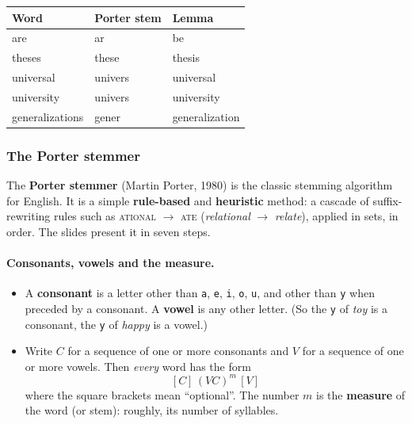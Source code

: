 \begin{center}
\small
\begin{tabular}{@{}l l l@{}}
\toprule
\textbf{Word} & \textbf{Porter stem} & \textbf{Lemma} \\
\midrule
are          & ar       & be \\
theses       & these    & thesis \\
universal    & univers  & universal \\
university   & univers  & university \\
generalizations & gener & generalization \\
\bottomrule
\end{tabular}
\end{center}

\subsubsection{The Porter stemmer}

The \textbf{Porter stemmer} (Martin Porter, 1980) is the classic stemming algorithm for
English. It is a simple \textbf{rule-based} and \textbf{heuristic} method: a cascade of
suffix-rewriting rules such as \textsc{ational} $\to$ \textsc{ate}
(\emph{relational} $\to$ \emph{relate}), applied in sets, in order. The slides present
it in seven steps.

\paragraph{Consonants, vowels and the measure.}
\begin{itemize}[nosep]
  \item A \textbf{consonant} is a letter other than \texttt{a}, \texttt{e}, \texttt{i},
        \texttt{o}, \texttt{u}, and other than \texttt{y} when preceded by a consonant.
        A \textbf{vowel} is any other letter. (So the \texttt{y} of \emph{toy} is a
        consonant, the \texttt{y} of \emph{happy} is a vowel.)
  \item Write $C$ for a sequence of one or more consonants and $V$ for a sequence of one
        or more vowels. Then \emph{every} word has the form
        \[ [C]\,(VC)^{m}\,[V] \]
        where the square brackets mean ``optional''. The number $m$ is the
        \textbf{measure} of the word (or stem): roughly, its number of syllables.
\end{itemize}


